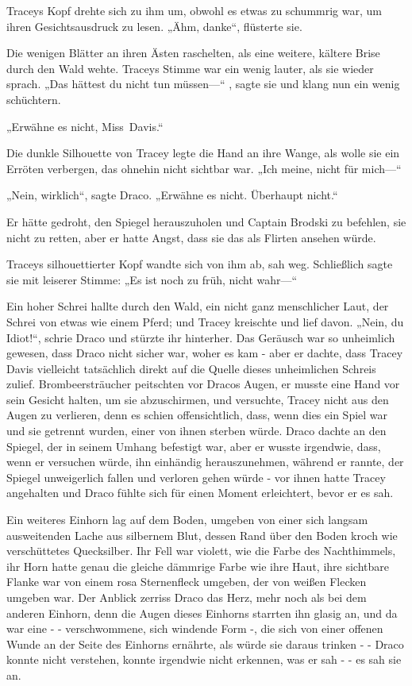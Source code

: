 {Traceys Kopf drehte sich zu ihm um, obwohl es etwas zu schummrig war, um ihren Gesichtsausdruck zu lesen. „Ähm, danke“, flüsterte sie.

Die wenigen Blätter an ihren Ästen raschelten, als eine weitere, kältere Brise durch den Wald wehte. Traceys Stimme war ein wenig lauter, als sie wieder sprach. „Das hättest du nicht tun müssen—“ , sagte sie und klang nun ein wenig schüchtern.

„Erwähne es nicht, Miss~Davis.“

Die dunkle Silhouette von Tracey legte die Hand an ihre Wange, als wolle sie ein Erröten verbergen, das ohnehin nicht sichtbar war. „Ich meine, nicht für mich—“

„Nein, wirklich“, sagte Draco. „Erwähne es nicht. Überhaupt nicht.“

Er hätte gedroht, den Spiegel herauszuholen und Captain Brodski zu befehlen, sie nicht zu retten, aber er hatte Angst, dass sie das als Flirten ansehen würde.

Traceys silhouettierter Kopf wandte sich von ihm ab, sah weg. Schließlich sagte sie mit leiserer Stimme: „Es ist noch zu früh, nicht wahr—“

Ein hoher Schrei hallte durch den Wald, ein nicht ganz menschlicher Laut, der Schrei von etwas wie einem Pferd; und Tracey kreischte und lief davon. „Nein, du Idiot!“, schrie Draco und stürzte ihr hinterher. Das Geräusch war so unheimlich gewesen, dass Draco nicht sicher war, woher es kam - aber er dachte, dass Tracey Davis vielleicht tatsächlich direkt auf die Quelle dieses unheimlichen Schreis zulief. Brombeersträucher peitschten vor Dracos Augen, er musste eine Hand vor sein Gesicht halten, um sie abzuschirmen, und versuchte, Tracey nicht aus den Augen zu verlieren, denn es schien offensichtlich, dass, wenn dies ein Spiel war und sie getrennt wurden, einer von ihnen sterben würde. Draco dachte an den Spiegel, der in seinem Umhang befestigt war, aber er wusste irgendwie, dass, wenn er versuchen würde, ihn einhändig herauszunehmen, während er rannte, der Spiegel unweigerlich fallen und verloren gehen würde - vor ihnen hatte Tracey angehalten und Draco fühlte sich für einen Moment erleichtert, bevor er es sah.

Ein weiteres Einhorn lag auf dem Boden, umgeben von einer sich langsam ausweitenden Lache aus silbernem Blut, dessen Rand über den Boden kroch wie verschüttetes Quecksilber. Ihr Fell war violett, wie die Farbe des Nachthimmels, ihr Horn hatte genau die gleiche dämmrige Farbe wie ihre Haut, ihre sichtbare Flanke war von einem rosa Sternenfleck umgeben, der von weißen Flecken umgeben war. Der Anblick zerriss Draco das Herz, mehr noch als bei dem anderen Einhorn, denn die Augen dieses Einhorns starrten ihn glasig an, und da war eine - - verschwommene, sich windende Form -, die sich von einer offenen Wunde an der Seite des Einhorns ernährte, als würde sie daraus trinken - - Draco konnte nicht verstehen, konnte irgendwie nicht erkennen, was er sah - - es sah sie an.

}
